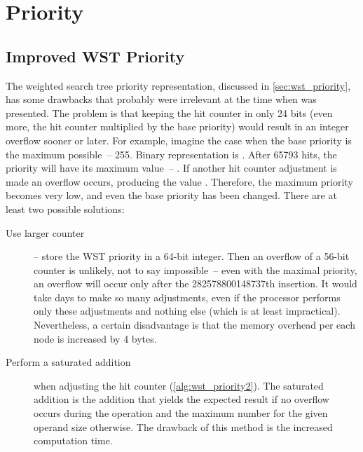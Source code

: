 \section{Priority}

\subsection{Improved WST Priority}
The weighted search tree priority representation, discussed in \cref{sec:wst_priority}, has some drawbacks that probably were irrelevant at the time when \cite{park90} was presented. The problem is that keeping the hit counter in only 24 bits (even more, the hit counter multiplied by the base priority) would result in an integer overflow sooner or later. For example, imagine the case when the base priority is the maximum possible~-- 255. Binary representation is . After 65793 hits, the priority will have its maximum value~-- . If another hit counter adjustment is made an overflow occurs, producing the value . Therefore, the maximum priority becomes very low, and even the base priority has been changed. There are at least two possible solutions:
\begin{description}
\item[Use larger counter]-- store the WST priority in a 64-bit integer. Then an overflow of a 56-bit counter is unlikely, not to say impossible~-- even with the maximal priority, an overflow will occur only after the 282578800148737th insertion. It would take days to make so many adjustments, even if the processor performs only these adjustments and nothing else (which is at least impractical). Nevertheless, a certain disadvantage is that the memory overhead per each node is increased by 4 bytes.
\item[Perform a saturated addition] when adjusting the hit counter (\cref{alg:wst_priority2}). The saturated addition is the addition that yields the expected result if no overflow occurs during the operation and the maximum number for the given operand size otherwise. The drawback of this method is the increased computation time.
\end{description}

